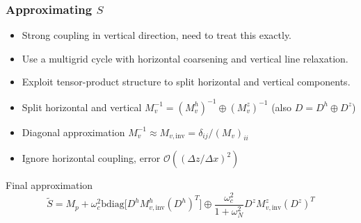 \documentclass[presentation]{beamer}
\begin{document}
\begin{frame}[allowframebreaks]
  \frametitle{Approximating $S$}
  \begin{itemize}
  \item Strong coupling in vertical direction, need to treat this
    exactly.
  \item Use a multigrid cycle with horizontal coarsening and
    vertical line relaxation.
  \item Exploit tensor-product structure to split horizontal and
    vertical components.
  \end{itemize}
  \framebreak

  \begin{itemize}
  \item Split horizontal and vertical $M_v^{-1} =
    (M_v^h)^{-1}\oplus (M_v^z)^{-1}$ (also $D
    = D^h \oplus D^z$)
  \item Diagonal approximation $M_v^{-1} \approx M_{v,\text{inv}} = \delta_{ij} / (M_v)_{ii}$
  \item Ignore horizontal coupling, error $\mathcal{O}((\Delta z/
    \Delta x)^2)$
  \end{itemize}
  \begin{block}{Final approximation}
    \begin{equation*}
      \tilde{S} = M_p + \omega_c^2 \text{bdiag}\big[D^h M_{v,\text{inv}}^h
      (D^h)^T\big] \oplus \frac{\omega_c^2}{1 + \omega_N^2} D^z
      M_{v,\text{inv}}^z (D^z)^T
    \end{equation*}
  \end{block}
\end{frame}
\end{document}
